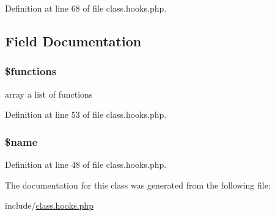Definition at line 68 of file class.\-hooks.\-php.




\subsection{Field Documentation}
\hypertarget{class_filter_aa75daea491817f3b64daa2f51128bcdf}{
\subsubsection[{\$functions}]{\setlength{\rightskip}{0pt plus 5cm}\$functions}}\label{class_filter_aa75daea491817f3b64daa2f51128bcdf}
array a list of functions 

Definition at line 53 of file class.\-hooks.\-php.

\hypertarget{class_filter_ab2fc40d43824ea3e1ce5d86dee0d763b}{
\subsubsection[{\$name}]{\setlength{\rightskip}{0pt plus 5cm}\$name}}\label{class_filter_ab2fc40d43824ea3e1ce5d86dee0d763b}


Definition at line 48 of file class.\-hooks.\-php.



The documentation for this class was generated from the following file\-:\begin{DoxyCompactItemize}
\item 
include/\hyperlink{class_8hooks_8php}{class.\-hooks.\-php}\end{DoxyCompactItemize}
